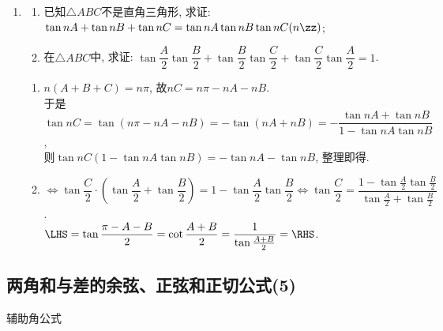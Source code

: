 \begin{enumerate}
\item
\begin{enumerate}[(1)]
\item 已知$\triangle{ABC}$不是直角三角形, 求证: $\tan{nA}+\tan{nB}+\tan{nC}=\tan{nA}\tan{nB}\tan{nC}(n\zz)$; 
\item 在$\triangle{ABC}$中, 求证: $\tan\dfrac{A}{2}\tan\dfrac{B}{2}+\tan\dfrac{B}{2}\tan\dfrac{C}{2}+\tan\dfrac{C}{2}\tan\dfrac{A}{2}=1$. 
\end{enumerate}
\begin{jieda}
\begin{enumerate}[(1)]
\item $n(A+B+C)=n\pi$, 故$nC=n\pi-nA-nB$. \\
于是$\tan{nC}=\tan(n\pi-nA-nB)=-\tan(nA+nB)=-\dfrac{\tan{nA}+\tan{nB}}{1-\tan{nA}\tan{nB}}$, \\
则$\tan{nC}(1-\tan{nA}\tan{nB})=-\tan{nA}-\tan{nB}$, 整理即得. 

\item $\iff\tan\dfrac{C}{2}\cdot\left(\tan\dfrac{A}{2}+\tan\dfrac{B}{2}\right)=1-\tan\dfrac{A}{2}\tan\dfrac{B}{2}
\iff\tan\dfrac{C}{2}=\dfrac{1-\tan\frac{A}{2}\tan\frac{B}{2}}{\tan\frac{A}{2}+\tan\frac{B}{2}}$. \\
$\LHS=\tan\dfrac{\pi-A-B}{2}=\cot\dfrac{A+B}{2}=\dfrac{1}{\tan\frac{A+B}{2}}=\RHS$. 
\end{enumerate}
\end{jieda}



\end{enumerate}




\subsection{两角和与差的余弦、正弦和正切公式(5)}
\zsd 辅助角公式

